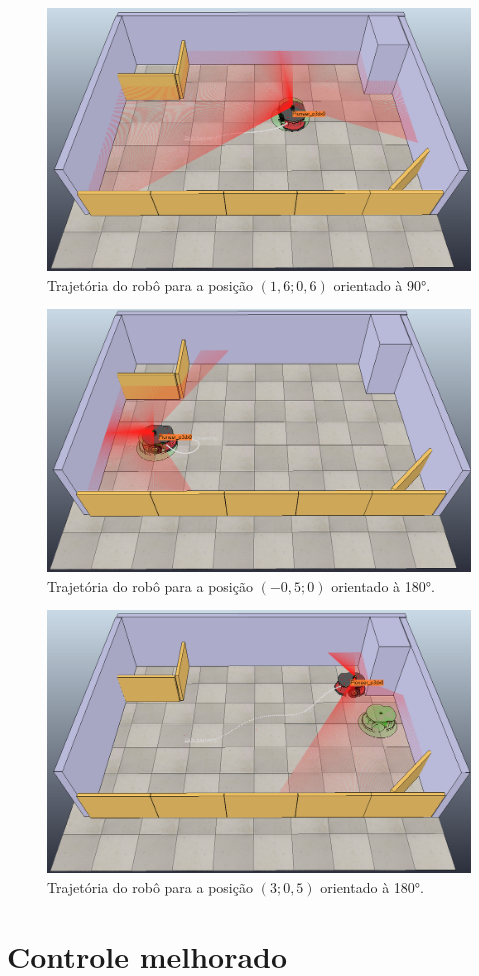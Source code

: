 \begin{figure}[H]
\centering
\includegraphics[width=0.6\linewidth]{img/4-1-2}
\caption{Trajetória do robô para a posição $(1,6; 0,6)$ orientado à 90°.}
\label{fig:4-1-2}
\end{figure}



\begin{figure}[H]
\centering
\includegraphics[width=0.6\linewidth]{img/4-2-2}
\caption{Trajetória do robô para a posição $(-0,5; 0)$ orientado à 180°.}
\label{fig:4-2-2}
\end{figure}


\begin{figure}[H]
\centering
\includegraphics[width=0.6\linewidth]{img/4-3-2}
\caption{Trajetória do robô para a posição $(3; 0,5)$ orientado à 180°.}
\label{fig:4-3-2}
\end{figure}




\section{Controle melhorado}

